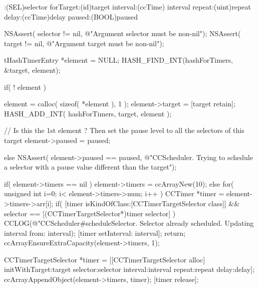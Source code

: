 \begin{DoxyCode}
                        :(SEL)selector forTarget:(id)target interval:(ccTime)
      interval repeat:(uint)repeat delay:(ccTime)delay paused:(BOOL)paused 
{
        NSAssert( selector != nil, @"Argument selector must be non-nil");
        NSAssert( target != nil, @"Argument target must be non-nil");

        tHashTimerEntry *element = NULL;
        HASH_FIND_INT(hashForTimers, &target, element);

        if( ! element ) {
                element = calloc( sizeof( *element ), 1 );
                element->target = [target retain];
                HASH_ADD_INT( hashForTimers, target, element );

                // Is this the 1st element ? Then set the pause level to all
       the selectors of this target
                element->paused = paused;

        } else
                NSAssert( element->paused == paused, @"CCScheduler. Trying to
       schedule a selector with a pause value different than the target");


        if( element->timers == nil )
                element->timers = ccArrayNew(10);
        else
        {
                for( unsigned int i=0; i< element->timers->num; i++ ) {
                        CCTimer *timer = element->timers->arr[i];
                        if( [timer isKindOfClass:[CCTimerTargetSelector class]]
       && selector == [(CCTimerTargetSelector*)timer selector] ) {
                                CCLOG(@"CCScheduler#scheduleSelector. Selector
       already scheduled. Updating interval from: %
      interval);
                                [timer setInterval: interval];
                                return;
                        }
                }
                ccArrayEnsureExtraCapacity(element->timers, 1);
        }

        CCTimerTargetSelector *timer = [[CCTimerTargetSelector alloc] 
      initWithTarget:target selector:selector interval:interval repeat:repeat delay:delay];
        ccArrayAppendObject(element->timers, timer);
        [timer release];
}
\end{DoxyCode}
